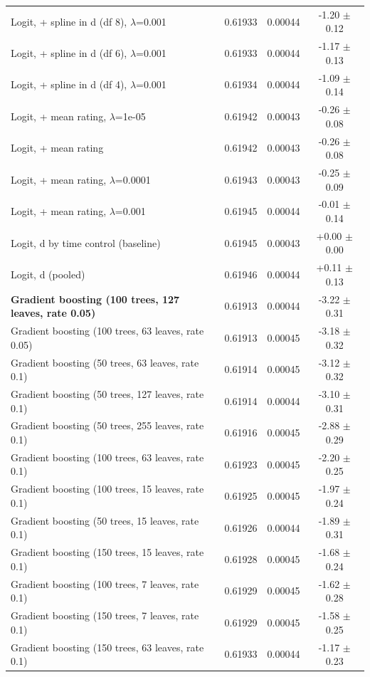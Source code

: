 \begin{table}[h]
\begin{tabular}{lccc}
Logit, + spline in d (df 8), $\lambda$=0.001 & 0.61933 & 0.00044 & -1.20 $\pm$ 0.12 \\
Logit, + spline in d (df 6), $\lambda$=0.001 & 0.61933 & 0.00044 & -1.17 $\pm$ 0.13 \\
Logit, + spline in d (df 4), $\lambda$=0.001 & 0.61934 & 0.00044 & -1.09 $\pm$ 0.14 \\
Logit, + mean rating, $\lambda$=1e-05 & 0.61942 & 0.00043 & -0.26 $\pm$ 0.08 \\
Logit, + mean rating & 0.61942 & 0.00043 & -0.26 $\pm$ 0.08 \\
Logit, + mean rating, $\lambda$=0.0001 & 0.61943 & 0.00043 & -0.25 $\pm$ 0.09 \\
Logit, + mean rating, $\lambda$=0.001 & 0.61945 & 0.00044 & -0.01 $\pm$ 0.14 \\
Logit, d by time control (baseline) & 0.61945 & 0.00043 & +0.00 $\pm$ 0.00 \\
Logit, d (pooled) & 0.61946 & 0.00044 & +0.11 $\pm$ 0.13 \\
\midrule
\textbf{Gradient boosting (100 trees, 127 leaves, rate 0.05)} & 0.61913 & 0.00044 & -3.22 $\pm$ 0.31 \\
Gradient boosting (100 trees, 63 leaves, rate 0.05) & 0.61913 & 0.00045 & -3.18 $\pm$ 0.32 \\
Gradient boosting (50 trees, 63 leaves, rate 0.1) & 0.61914 & 0.00045 & -3.12 $\pm$ 0.32 \\
Gradient boosting (50 trees, 127 leaves, rate 0.1) & 0.61914 & 0.00044 & -3.10 $\pm$ 0.31 \\
Gradient boosting (50 trees, 255 leaves, rate 0.1) & 0.61916 & 0.00045 & -2.88 $\pm$ 0.29 \\
Gradient boosting (100 trees, 63 leaves, rate 0.1) & 0.61923 & 0.00045 & -2.20 $\pm$ 0.25 \\
Gradient boosting (100 trees, 15 leaves, rate 0.1) & 0.61925 & 0.00045 & -1.97 $\pm$ 0.24 \\
Gradient boosting (50 trees, 15 leaves, rate 0.1) & 0.61926 & 0.00044 & -1.89 $\pm$ 0.31 \\
Gradient boosting (150 trees, 15 leaves, rate 0.1) & 0.61928 & 0.00045 & -1.68 $\pm$ 0.24 \\
Gradient boosting (100 trees, 7 leaves, rate 0.1) & 0.61929 & 0.00045 & -1.62 $\pm$ 0.28 \\
Gradient boosting (150 trees, 7 leaves, rate 0.1) & 0.61929 & 0.00045 & -1.58 $\pm$ 0.25 \\
Gradient boosting (150 trees, 63 leaves, rate 0.1) & 0.61933 & 0.00044 & -1.17 $\pm$ 0.23 \\

\end{tabular}
\end{table}
